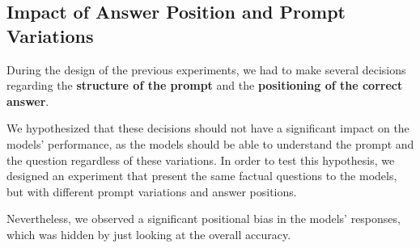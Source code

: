 \subsection{Impact of Answer Position and Prompt Variations}

During the design of the previous experiments, we had to make several decisions regarding the \textbf{structure of the prompt} and the \textbf{positioning of the correct answer}.

We hypothesized that these decisions should not have a significant impact on the models' performance, as the models should be able to understand the prompt and the question regardless of these variations. In order to test this hypothesis, we designed an experiment that present the same factual questions to the models, but with different prompt variations and answer positions.

Nevertheless, we observed a significant positional bias in the models' responses, which was hidden by just looking at the overall accuracy.

